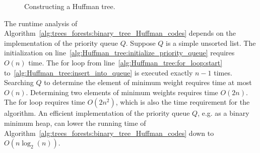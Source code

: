 \begin{figure}[!htbp]
{}
\qquad\qquad
{}
\qquad\quad
{}
\qquad\qquad
{}
\caption{Constructing a Huffman tree.}
\label{fig:trees_forests:construct_Huffman_tree}
\end{figure}

The runtime analysis of
Algorithm~\ref{alg:trees_forests:binary_tree_Huffman_codes} depends on
the implementation of the priority queue
$Q$. Suppose $Q$ is a simple unsorted list. The
initialization on
line~\ref{alg:Huffman_tree:initialize_priority_queue} requires $O(n)$
time. The for loop from line~\ref{alg:Huffman_tree:for_loop:start}
to~\ref{alg:Huffman_tree:insert_into_queue} is executed exactly
$n - 1$ times. Searching $Q$ to determine the element of minimum
weight requires time at most $O(n)$. Determining two elements of
minimum weights requires time $O(2n)$. The for loop requires time
$O(2n^2)$, which is also the time requirement for the algorithm. An
efficient implementation of the priority queue $Q$, e.g. as a binary
minimum heap, can lower the running time of
Algorithm~\ref{alg:trees_forests:binary_tree_Huffman_codes} down to
$O(n \log_2(n))$.

